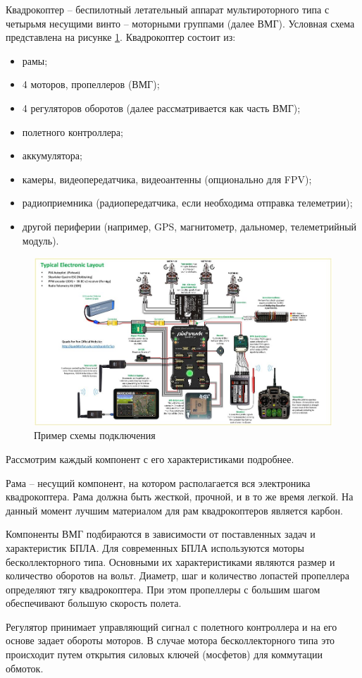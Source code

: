 Квадрокоптер -- беспилотный летательный аппарат мультироторного типа с четырьмя несущими винто -- моторными группами (далее ВМГ). Условная схема представлена на рисунке \ref{fig:pix}.
Квадрокоптер состоит из:
\begin{itemize}
	\item рамы;
	\item 4 моторов, пропеллеров (ВМГ);
	\item 4 регуляторов оборотов (далее рассматривается как часть ВМГ);
	\item полетного контроллера;
	\item аккумулятора;
	\item камеры, видеопередатчика, видеоантенны (опционально для FPV);
	\item радиоприемника (радиопередатчика, если необходима отправка телеметрии);
	\item другой периферии (например, GPS, магнитометр, дальномер, телеметрийный модуль).
\end{itemize}

 \begin{figure}[H]
 	\centering
 	\includegraphics[width=0.5\linewidth]{../RW/pics/pix}
 	\caption{Пример схемы подключения
 	}
 	\label{fig:pix}
 \end{figure}

Рассмотрим каждый компонент с его характеристиками подробнее.

Рама -- несущий компонент, на котором располагается вся электроника квадрокоптера. Рама должна быть жесткой, прочной, и в то же время легкой. На данный момент лучшим материалом для рам квадрокоптеров является карбон.

Компоненты ВМГ подбираются в зависимости от поставленных задач и характеристик БПЛА. Для современных БПЛА используются моторы бесколлекторного типа. Основными их характеристиками являются размер и количество оборотов на вольт.
Диаметр, шаг и количество лопастей пропеллера определяют тягу квадрокоптера. При этом пропеллеры с большим шагом обеспечивают большую скорость полета.

Регулятор принимает управляющий сигнал с полетного контроллера и на его основе задает обороты моторов. В случае мотора бесколлекторного типа это происходит путем открытия силовых ключей (мосфетов) для коммутации обмоток.

